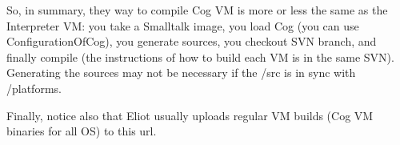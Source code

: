 \documentclass[a4paper,10pt,twoside]{book}
\begin{document}
So, in summary, they way to compile Cog VM is more or less the same as the Interpreter VM: you take a Smalltalk image, you load Cog (you can use ConfigurationOfCog), you generate sources, you checkout SVN branch, and finally compile (the instructions of how to build each VM is in the same SVN). Generating the sources may not be necessary if the /src is in sync with /platforms.

Finally, notice also that Eliot usually uploads regular VM builds (Cog VM binaries for all OS) to this url.

\ifx\wholebook\relax\else
   
   
\end{document}
